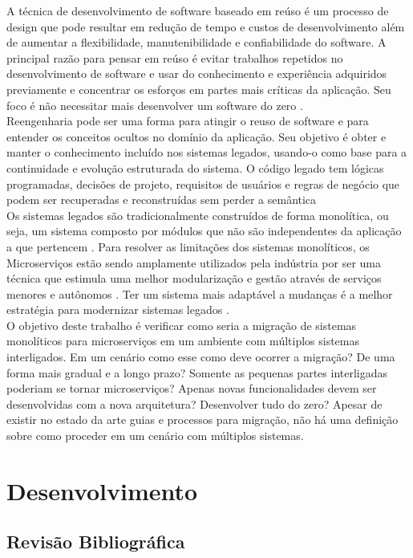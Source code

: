 \documentclass[12pt]{article}
\begin{document}
A técnica de desenvolvimento de software baseado em reúso é um processo de design que pode resultar em redução de tempo e custos de desenvolvimento além de aumentar a flexibilidade, manutenibilidade e confiabilidade do software. A principal razão para pensar em reúso é evitar trabalhos repetidos no desenvolvimento de software e usar do conhecimento e experiência adquiridos previamente e concentrar os esforços em partes mais críticas da aplicação. Seu foco é não necessitar mais desenvolver um software do zero \cite{Yang}.  
\\
Reengenharia pode ser uma forma para atingir o reuso de software e para entender os conceitos ocultos no domínio da aplicação. Seu objetivo é obter e manter o conhecimento incluído nos sistemas legados, usando-o como base para a continuidade e evolução estruturada do sistema. O código legado tem lógicas programadas, decisões de projeto, requisitos de usuários e regras de negócio que podem ser recuperadas e reconstruídas sem perder a semântica \cite{Garcia2004a}
\\
Os sistemas legados são tradicionalmente construídos de forma monolítica, ou seja, um sistema composto por módulos que não são independentes da aplicação a que pertencem \cite{Dragoni2017}. Para resolver as limitações dos sistemas monolíticos, os Microserviços estão sendo amplamente utilizados pela indústria por ser uma técnica que estimula uma melhor modularização e gestão através de serviços menores e autônomos \cite{Carvalho2019}. Ter um sistema mais adaptável a mudanças é a melhor estratégia para modernizar sistemas legados \cite{Kamimura2019a}.
\\
O objetivo deste trabalho é verificar como seria a migração de sistemas monolíticos para microserviços em um ambiente com múltiplos sistemas interligados. Em um cenário como esse como deve ocorrer a migração? De uma forma mais gradual e a longo prazo? Somente as pequenas partes interligadas poderiam se tornar microserviços? Apenas novas funcionalidades devem ser desenvolvidas com a nova arquitetura? Desenvolver tudo do zero? Apesar de existir no estado da arte guias e processos para migração, não há uma definição sobre como proceder em um cenário com múltiplos sistemas. 

\section{Desenvolvimento} \label{sec:firstpage}

\subsection{Revisão Bibliográfica}
\end{document}
